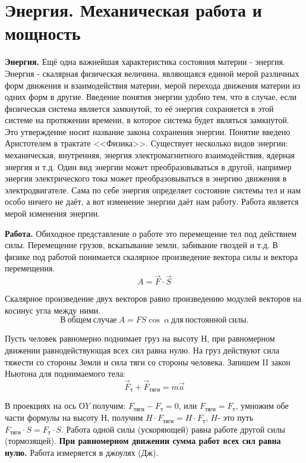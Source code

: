 \documentclass[a5paper, 10pt]{diss_4}
\renewcommand{\'}{\,'}
\begin{document}
\section{Энергия. Механическая работа и мощность}

\textbf{Энергия.}
  Ещё одна важнейшая характеристика состояния материи - энергия. Энергия
- скалярная физическая величина, являющаяся единой мерой различных форм
движения и взаимодействия материи, мерой перехода движения материи из одних
форм в другие. Введение понятия энергии удобно тем, что в случае, если
физическая система является замкнутой, то её энергия сохраняется в этой системе
на протяжении времени, в которое система будет являться замкнутой. Это
утверждение носит название закона сохранения энергии. Понятие введено
Аристотелем в трактате <<Физика>>. Существует несколько видов энергии:
механическая, внутренняя, энергия электромагнитного взаимодействия, ядерная
энергия и т.д. Один вид энергии может преобразовываться в другой, например
энергия электрического тока может преобразовываться в энергию движения в
электродвигателе. Сама по себе энергия определяет состояние системы тел и нам
особо ничего не даёт, а вот изменение энергии даёт нам работу. Работа является
мерой изменения энергии.

\textbf{Работа.}
  Обиходное представление о работе это перемещение тел под действием силы.
Перемещение грузов, вскапывание земли, забивание гвоздей и т.д. В физике под
работой понимается скалярное произведение вектора силы и вектора перемещения.
\[
A=\vec{F}\cdot\vec{S}
\]

  Скалярное произведение двух векторов равно произведению модулей векторов
на косинус угла между ними.
\[
     В\ общем\ случае\ A=FS\cos\ \alpha\ для\ постоянной\ силы.
\]

  Пусть человек равномерно поднимает груз на высоту $Н$, при равномерном
движении равнодействующая всех сил равна нулю. На груз действуют сила тяжести
со стороны Земли и сила тяги со стороны человека. Запишем II закон Ньютона для
поднимаемого тела:
        \[
        \vec{F}_{т}+\vec{F}_{тяги}=m\vec{a}
        \]

  В проекциях на ось $ОY$ получим: $F_{тяги}-F_{т}=0$, или $F_{тяги}=F_{т}$,
умножим обе части формулы на высоту $Н$, получим $H\cdot F_{тяги}=H\cdot F_{т}$,
 $H$- это путь $F_{тяги}\cdot S=F_{т}\cdot S$. Работа одной силы (ускоряющей)
 равна работе другой силы (тормозящей). \textbf{При равномерном движении сумма
работ всех сил равна нулю.} Работа измеряется в джоулях (Дж).
\end{document}

